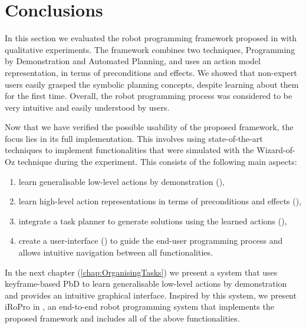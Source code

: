 \section{Conclusions}
In this section we evaluated the robot programming framework proposed in  with qualitative experiments. 
The framework combines two techniques, Programming by Demonstration and Automated Planning, and uses an action model representation, in terms of preconditions and effects.
We showed that non-expert users easily grasped the symbolic planning concepts, despite learning about them for the first time. 
Overall, the robot programming process was considered to be very intuitive and easily understood by users. 

Now that we have verified the possible usability of the proposed framework, the focus lies in its full implementation. 
This involves using state-of-the-art techniques to implement functionalities that were simulated with the Wizard-of-Oz technique during the experiment. 
This consists of the following main aspects: 
\begin{enumerate}
	\item learn generalisable low-level actions by demonstration (\eg \cite{akgun2012keyframe,pastor2009learning}),
	\item learn high-level action representations in terms of preconditions and effects (\eg \cite{abdo2013learning,mollard2015robot}),
	\item integrate a task planner to generate solutions using the learned actions (\eg \cite{abdo2013learning}),
	\item create a user-interface (\eg \cite{alexandrova2014robot,huang2017code3}) to guide the end-user programming process and allows intuitive navigation between all functionalities.
\end{enumerate}
In the next chapter (\ref{chap:OrganisingTasks}) we present a system that uses keyframe-based PbD to learn generalisable low-level actions by demonstration and provides an intuitive graphical interface.
Inspired by this system, we present iRoPro in , an end-to-end robot programming system that implements the proposed framework and includes all of the above functionalities.